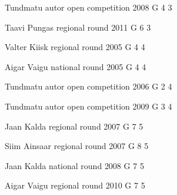 \documentclass[11pt]{article}
\begin{document}
\ylDisplay{} %
{Tundmatu autor} %
{open competition} %
{2008} %
{G 4} %
{3} %
{

\ifEngSolution
\fi
}

\ylDisplay{} %
{Taavi Pungas} %
{regional round} %
{2011} %
{G 6} %
{3} %
{

\ifEngSolution
\fi
}

\ylDisplay{} %
{Valter Kiisk} %
{regional round} %
{2005} %
{G 4} %
{4} %
{

\ifEngSolution
\fi
}

\ylDisplay{} %
{Aigar Vaigu} %
{national round} %
{2005} %
{G 4} %
{4} %
{

\ifEngSolution
\fi
}

\ylDisplay{} %
{Tundmatu autor} %
{open competition} %
{2006} %
{G 2} %
{4} %
{

\ifEngSolution
\fi
}

\ylDisplay{} %
{Tundmatu autor} %
{open competition} %
{2009} %
{G 3} %
{4} %
{

\ifEngSolution
\fi
}

\ylDisplay{} %
{Jaan Kalda} %
{regional round} %
{2007} %
{G 7} %
{5} %
{

\ifEngSolution
\fi
}

\ylDisplay{} %
{Siim Ainsaar} %
{regional round} %
{2007} %
{G 8} %
{5} %
{

\ifEngSolution
\fi
}

\ylDisplay{} %
{Jaan Kalda} %
{national round} %
{2008} %
{G 7} %
{5} %
{

\ifEngSolution
\fi
}

\ylDisplay{} %
{Aigar Vaigu} %
{regional round} %
{2010} %
{G 7} %
{5} %
{

\ifEngSolution
\fi
}
\end{document}
